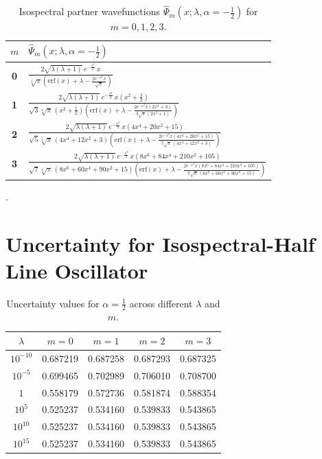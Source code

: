 \documentclass[12pt]{article}
\begin{document}
\begin{table}[htp]
\centering
\begin{tabularx}{\textwidth}{>{\bfseries}c|X}
\toprule
$m$ & $\hat{\Psi}_m(x;\lambda,\alpha=-\tfrac{1}{2})$ \\
\midrule
0 & $\displaystyle 
\frac{2 \sqrt{\lambda (\lambda +1)} \, e^{-\tfrac{x^2}{2}} \, x}
{\sqrt[4]{\pi} \left( \text{erf}(x) + \lambda 
 - \tfrac{2 e^{-x^2} x}{\sqrt{\pi}} \right)}$ \\[1.0ex]

1 & $\displaystyle 
\frac{2 \sqrt{\lambda (\lambda +1)} \, e^{-\tfrac{x^2}{2}} \, x \left(x^2+\tfrac{3}{2}\right)}
{\sqrt{3}\sqrt[4]{\pi}\, \left(x^2+\tfrac{1}{2}\right) \left( \text{erf}(x) + \lambda 
 - \tfrac{2 e^{-x^2} x \left(2 x^2+3\right)}{3\sqrt{\pi}(2x^2+1)} \right)}$ \\[1.0ex]

2 & $\displaystyle 
\frac{2 \sqrt{\lambda (\lambda +1)} \, e^{-\tfrac{x^2}{2}} \, x \left(4 x^4+20 x^2+15\right)}
{\sqrt{5}\sqrt[4]{\pi}\, \left(4 x^4+12 x^2+3\right) \left( \text{erf}(x) + \lambda 
 - \tfrac{2 e^{-x^2} x (4 x^4+20 x^2+15)}{5\sqrt{\pi}\,(4 x^4+12 x^2+3)} \right)}$ \\[1.0ex]

3 & $\displaystyle 
\frac{2 \sqrt{\lambda (\lambda +1)} \, e^{-\tfrac{x^2}{2}} \, x \left(8 x^6+84 x^4+210 x^2+105\right)}
{\sqrt{7}\sqrt[4]{\pi}\, \left(8 x^6+60 x^4+90 x^2+15\right) \left( \text{erf}(x) + \lambda 
 - \tfrac{2 e^{-x^2} x (8 x^6+84 x^4+210 x^2+105)}{7\sqrt{\pi}\,(8 x^6+60 x^4+90 x^2+15)} \right)}$ \\[1.0ex]
\bottomrule
\end{tabularx}
\caption{Isospectral partner wavefunctions $\hat{\Psi}_m(x;\lambda,\alpha=-\tfrac{1}{2})$ 
for $m=0,1,2,3$.}
\label{tab:isospectral-GS-alphaMinus}
\end{table}


\newpage
.
\newpage


\section*{Uncertainty for Isospectral-Half Line Oscillator}

\begin{table}[htp]
\centering
\begin{tabular}{c|cccc}
\toprule
$\lambda$ & $m=0$ & $m=1$ & $m=2$ & $m=3$ \\
\midrule
$10^{-10}$ & 0.687219 & 0.687258 & 0.687293 & 0.687325 \\
$10^{-5}$  & 0.699465 & 0.702989 & 0.706010 & 0.708700 \\
$1$        & 0.558179 & 0.572736 & 0.581874 & 0.588354 \\
$10^{5}$   & 0.525237 & 0.534160 & 0.539833 & 0.543865 \\
$10^{10}$  & 0.525237 & 0.534160 & 0.539833 & 0.543865 \\
$10^{15}$  & 0.525237 & 0.534160 & 0.539833 & 0.543865 \\
\bottomrule
\end{tabular}
\caption{Uncertainty values for $\alpha = \tfrac{1}{2}$ across different $\lambda$ and $m$.}
\label{tab:uncertainty-alpha-half}
\end{table}
\end{document}
